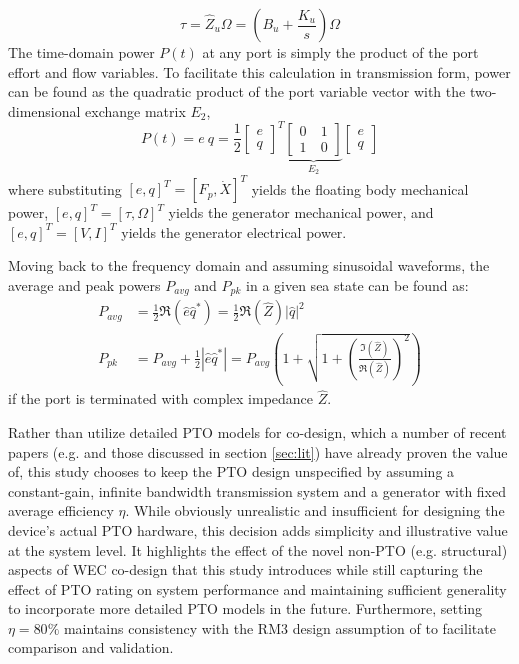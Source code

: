 \begin{equation}
\tau = \hat{Z}_u \Omega =\left(B_u + \frac{K_u}{s} \right) \Omega
\end{equation}
The time-domain power $P(t)$ at any port is simply the product of the port effort and flow variables.
To facilitate this calculation in transmission form, power can be found as the quadratic product of the port variable vector with the two-dimensional exchange matrix $E_2$,
\begin{equation}
P(t) = e~q
= \frac{1}{2}
\begin{bmatrix}
 e \\ q
\end{bmatrix}^T
\underbrace{\begin{bmatrix}
0~ & 1 \\
1~ & 0
\end{bmatrix}}
_{E_2}
\begin{bmatrix}
 e \\ q
\end{bmatrix}
\end{equation}
where substituting $[e,q]^T=[F_p,\dot{X}]^T$ yields the floating body mechanical power, $[e,q]^T=[\tau,\Omega]^T$ yields the generator mechanical power, and $[e,q]^T=[V,I]^T$ yields the generator electrical power. 

Moving back to the frequency domain and assuming sinusoidal waveforms, the average and peak powers $P_{avg}$ and $P_{pk}$ in a given sea state can be found as:
\begin{equation}
\begin{aligned}
     P_{avg} &= \frac{1}{2}\Re(\hat{e} \hat{q}^*) = \frac{1}{2} \Re(\hat{Z})|\hat{q}|^2 
    \\
    P_{pk} &=  P_{avg} + \frac{1}{2}|\hat{e} \hat{q}^*| = P_{avg}\left( 1 + \sqrt{1 + \left(\frac{\Im(\hat{Z})}{\Re(\hat{Z})}\right) ^2  } \right)
\end{aligned}
\end{equation}
if the port is terminated with complex impedance $\hat{Z}$. 

Rather than utilize detailed PTO models for co-design, which a number of recent papers (e.g. \cite{coe_useful_2023,gaebele_incorporating_2023} and those discussed in section \ref{sec:lit}) have already proven the value of, this study chooses to keep the PTO design unspecified by assuming a constant-gain, infinite bandwidth transmission system and a generator with fixed average efficiency $\eta$.
While obviously unrealistic and insufficient for designing the device's actual PTO hardware, this decision adds simplicity and illustrative value at the system level.
It highlights the effect of the novel non-PTO (e.g. structural) aspects of WEC co-design that this study introduces while still capturing the effect of PTO rating on system performance and maintaining sufficient generality to incorporate more detailed PTO models in the future.
Furthermore, setting $\eta=80\%$ maintains consistency with the RM3 design assumption of \cite{RM3} to facilitate comparison and validation. 

